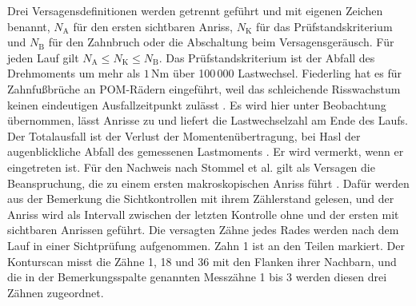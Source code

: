 Drei Versagensdefinitionen werden getrennt geführt und mit eigenen Zeichen benannt, $N_{\mathrm{A}}$ für den ersten sichtbaren Anriss, $N_{\mathrm{K}}$ für das Prüfstandskriterium und $N_{\mathrm{B}}$ für den Zahnbruch oder die Abschaltung beim Versagensgeräusch. Für jeden Lauf gilt $N_{\mathrm{A}} \le N_{\mathrm{K}} \le N_{\mathrm{B}}$. Das Prüfstandskriterium ist der Abfall des Drehmoments um mehr als $1$\,Nm über 100\,000 Lastwechsel. Fiederling hat es für Zahnfußbrüche an POM-Rädern eingeführt, weil das schleichende Risswachstum keinen eindeutigen Ausfallzeitpunkt zulässt \cite[Abschnitt~6.1, S.~65]{Fie23}. Es wird hier unter Beobachtung übernommen, lässt Anrisse zu und liefert die Lastwechselzahl am Ende des Laufs. Der Totalausfall ist der Verlust der Momentenübertragung, bei Hasl der augenblickliche Abfall des gemessenen Lastmoments \cite[S.~91]{Has18}. Er wird vermerkt, wenn er eingetreten ist. Für den Nachweis nach Stommel et al. gilt als Versagen die Beanspruchung, die zu einem ersten makroskopischen Anriss führt \cite[S.~204]{Sto18}. Dafür werden aus der Bemerkung die Sichtkontrollen mit ihrem Zählerstand gelesen, und der Anriss wird als Intervall zwischen der letzten Kontrolle ohne und der ersten mit sichtbaren Anrissen geführt. Die versagten Zähne jedes Rades werden nach dem Lauf in einer Sichtprüfung aufgenommen. Zahn 1 ist an den Teilen markiert. Der Konturscan misst die Zähne 1, 18 und 36 mit den Flanken ihrer Nachbarn, und die in der Bemerkungsspalte genannten Messzähne 1 bis 3 werden diesen drei Zähnen zugeordnet.


